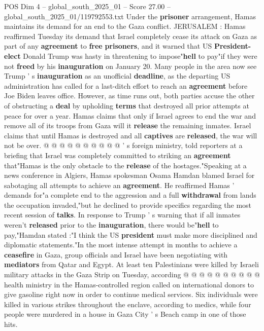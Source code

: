 \begin{textsample}{POS Dim 4 – global\_south\_2025\_01 – Score 27.00 – global\_south\_2025\_01/119792553.txt}  \label{ex:f4_pos_014}
Under the \textbf{prisoner} arrangement, Hamas maintains its demand for an end to the Gaza conflict.
JERUSALEM : Hamas reaffirmed Tuesday its demand that Israel completely cease its attack on Gaza as part of any \textbf{agreement} to \textbf{free} \textbf{prisoners}, and it warned that US \textbf{President-elect} Donald Trump was hasty in threatening to impose"\textbf{hell} to pay"if they were not \textbf{freed} by his \textbf{inauguration} on January 20.
Many people in the area now see Trump ' s \textbf{inauguration} as an unofficial \textbf{deadline}, as the departing US administration has called for a last-ditch effort to reach an \textbf{agreement} before Joe Biden leaves office.
However, as time runs out, both parties accuse the other of obstructing a \textbf{deal} by upholding \textbf{terms} that destroyed all prior attempts at peace for over a year.
Hamas claims that only if Israel agrees to end the war and remove all of its troops from Gaza will it \textbf{release} the remaining inmates.
Israel claims that until Hamas is destroyed and all \textbf{captives} are \textbf{released}, the war will not be over. @ @ @ @ @ @ @ @ @ @ ' s foreign ministry, told reporters at a briefing that Israel was completely committed to striking an \textbf{agreement} that"Hamas is the only obstacle to the \textbf{release} of the hostages."Speaking at a news conference in Algiers, Hamas spokesman Osama Hamdan blamed Israel for sabotaging all attempts to achieve an \textbf{agreement}.
He reaffirmed Hamas ' demands for"a complete end to the aggression and a full \textbf{withdrawal} from lands the occupation invaded,"but he declined to provide specifics regarding the most recent session of \textbf{talks}.
In response to Trump ' s warning that if all inmates weren't \textbf{released} prior to the \textbf{inauguration}, there would be"\textbf{hell} to pay,"Hamdan stated :"I think the US \textbf{president} must make more disciplined and diplomatic statements."In the most intense attempt in months to achieve a \textbf{ceasefire} in Gaza, group officials and Israel have been negotiating with \textbf{mediators} from Qatar and Egypt.
At least ten Palestinians were killed by Israeli military attacks in the Gaza Strip on Tuesday, according @ @ @ @ @ @ @ @ @ @ health ministry in the Hamas-controlled region called on international donors to give gasoline right now in order to continue medical services.
Six individuals were killed in various strikes throughout the enclave, according to medics, while four people were murdered in a house in Gaza City ' s Beach camp in one of those hits.

\end{textsample}
